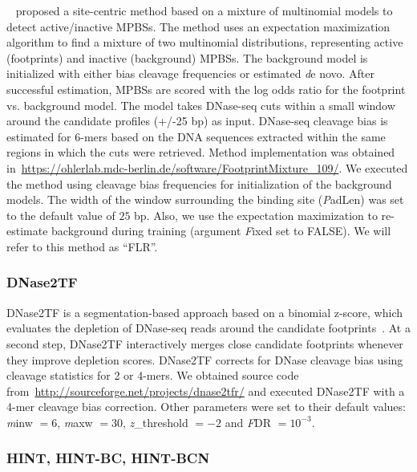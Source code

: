 \documentclass[11pt]{article}
\begin{document}
{{~\cite{yardimci2014} proposed a site-centric method based on a mixture of multinomial models to detect active/inactive MPBSs. The method uses an expectation maximization algorithm to find a mixture of two multinomial distributions, representing active (footprints) and inactive (background) MPBSs. The background model is initialized with either bias cleavage frequencies or estimated {\emph de novo}. After successful estimation, MPBSs are scored with the log odds ratio for the footprint vs. background model. The model takes DNase-seq cuts within a small window around the candidate profiles (+/-25 bp) as input. DNase-seq cleavage bias is estimated for 6-mers based on the DNA sequences extracted within the same regions in which the cuts were retrieved. Method implementation was obtained in~\url{https://ohlerlab.mdc-berlin.de/software/FootprintMixture_109/}. We executed the method using cleavage bias frequencies for initialization of the background models. The width of the window surrounding the binding site ({\emph PadLen}) was set to the default value of $25$ bp. Also, we use the expectation maximization to re-estimate background during training (argument {\emph Fixed} set to FALSE). We will refer to this method as ``FLR''.

\subsubsection{DNase2TF}
\label{sec:dnase2tf}

DNase2TF is a segmentation-based approach based on a binomial z-score, which evaluates the depletion of DNase-seq reads around the candidate footprints~\cite{sung2014}. At a second step, DNase2TF interactively merges close candidate footprints whenever they improve depletion scores. DNase2TF corrects for DNase cleavage bias using cleavage statistics for 2 or 4-mers. We obtained source code from~\url{http://sourceforge.net/projects/dnase2tfr/} and executed DNase2TF with a 4-mer cleavage bias correction. Other parameters were set to their default values: {\emph minw} $= 6$, {\emph maxw} $= 30$, {\emph z\_threshold} $= -2$ and {\emph FDR} $= 10^{-3}$.

}}

\subsubsection{HINT, HINT-BC, HINT-BCN}
\label{sec:hint}
\end{document}
